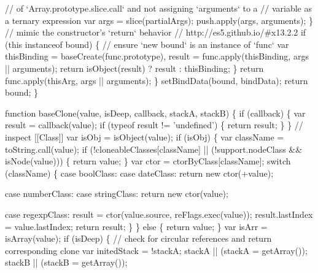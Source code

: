 \begin{DoxyCodeInclude}
\textcolor{stringliteral}{          // of `Array.prototype.slice.call` and not assigning `arguments` to a}
\textcolor{stringliteral}{          // variable as a ternary expression}
\textcolor{stringliteral}{          var args = slice(partialArgs);}
\textcolor{stringliteral}{          push.apply(args, arguments);}
\textcolor{stringliteral}{        \}}
\textcolor{stringliteral}{        // mimic the constructor'}s `\textcolor{keywordflow}{return}` behavior
        \textcolor{comment}{// http://es5.github.io/#x13.2.2}
        \textcolor{keywordflow}{if} (\textcolor{keyword}{this} instanceof bound) \{
          \textcolor{comment}{// ensure `new bound` is an instance of `func`}
          var thisBinding = baseCreate(func.prototype),
              result = func.apply(thisBinding, args || arguments);
          \textcolor{keywordflow}{return} isObject(result) ? result : thisBinding;
        \}
        \textcolor{keywordflow}{return} func.apply(thisArg, args || arguments);
      \}
      setBindData(bound, bindData);
      \textcolor{keywordflow}{return} bound;
    \}

    \textcolor{keyword}{function} baseClone(value, isDeep, callback, stackA, stackB) \{
      \textcolor{keywordflow}{if} (callback) \{
        var result = callback(value);
        \textcolor{keywordflow}{if} (typeof result != \textcolor{stringliteral}{'undefined'}) \{
          \textcolor{keywordflow}{return} result;
        \}
      \}
      \textcolor{comment}{// inspect [[Class]]}
      var isObj = isObject(value);
      \textcolor{keywordflow}{if} (isObj) \{
        var className = toString.call(value);
        \textcolor{keywordflow}{if} (!cloneableClasses[className] || (!support.nodeClass && isNode(value))) \{
          \textcolor{keywordflow}{return} value;
        \}
        var ctor = ctorByClass[className];
        \textcolor{keywordflow}{switch} (className) \{
          \textcolor{keywordflow}{case} boolClass:
          \textcolor{keywordflow}{case} dateClass:
            \textcolor{keywordflow}{return} \textcolor{keyword}{new} ctor(+value);

          \textcolor{keywordflow}{case} numberClass:
          \textcolor{keywordflow}{case} stringClass:
            \textcolor{keywordflow}{return} \textcolor{keyword}{new} ctor(value);

          \textcolor{keywordflow}{case} regexpClass:
            result = ctor(value.source, reFlags.exec(value));
            result.lastIndex = value.lastIndex;
            \textcolor{keywordflow}{return} result;
        \}
      \} \textcolor{keywordflow}{else} \{
        \textcolor{keywordflow}{return} value;
      \}
      var isArr = isArray(value);
      \textcolor{keywordflow}{if} (isDeep) \{
        \textcolor{comment}{// check for circular references and return corresponding clone}
        var initedStack = !stackA;
        stackA || (stackA = getArray());
        stackB || (stackB = getArray());


\end{DoxyCodeInclude}
